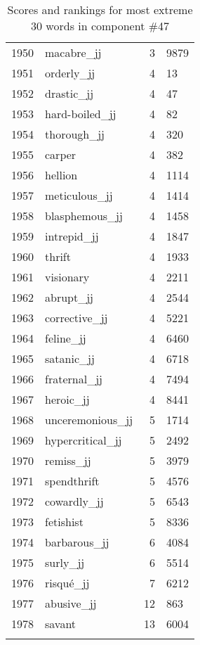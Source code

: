 \begin{longtable}[!htbp]{| rlr@{.}l |}
    1950 & macabre\_jj & 3 & 9879 \\
    1951 & orderly\_jj & 4 & 13 \\
    1952 & drastic\_jj & 4 & 47 \\
    1953 & hard-boiled\_jj & 4 & 82 \\
    1954 & thorough\_jj & 4 & 320 \\
    1955 & carper & 4 & 382 \\
    1956 & hellion & 4 & 1114 \\
    1957 & meticulous\_jj & 4 & 1414 \\
    1958 & blasphemous\_jj & 4 & 1458 \\
    1959 & intrepid\_jj & 4 & 1847 \\
    1960 & thrift & 4 & 1933 \\
    1961 & visionary & 4 & 2211 \\
    1962 & abrupt\_jj & 4 & 2544 \\
    1963 & corrective\_jj & 4 & 5221 \\
    1964 & feline\_jj & 4 & 6460 \\
    1965 & satanic\_jj & 4 & 6718 \\
    1966 & fraternal\_jj & 4 & 7494 \\
    1967 & heroic\_jj & 4 & 8441 \\
    1968 & unceremonious\_jj & 5 & 1714 \\
    1969 & hypercritical\_jj & 5 & 2492 \\
    1970 & remiss\_jj & 5 & 3979 \\
    1971 & spendthrift & 5 & 4576 \\
    1972 & cowardly\_jj & 5 & 6543 \\
    1973 & fetishist & 5 & 8336 \\
    1974 & barbarous\_jj & 6 & 4084 \\
    1975 & surly\_jj & 6 & 5514 \\
    1976 & risqué\_jj & 7 & 6212 \\
    1977 & abusive\_jj & 12 & 863 \\
    1978 & savant & 13 & 6004 \\
    \hline
    \caption{Scores and rankings for most extreme 30 words in component \#47} \\
\end{longtable}
